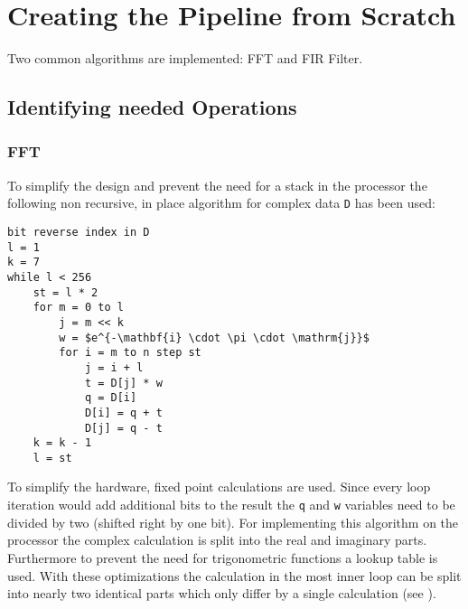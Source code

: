 \documentclass[11pt,twocolumn,technote,a4paper]{IEEEtran}
\begin{document}
\section{Creating the Pipeline from Scratch}
\label{sec:pipeline_from_scratch}
Two common algorithms are implemented: FFT and FIR Filter.
\subsection{Identifying needed Operations}
\label{sec:identify}
\subsubsection{FFT}
To simplify the design and prevent the need for a stack in the processor
the following non recursive, in place algorithm for complex data \verb+D+ has been
used:
\begin{lstlisting}[mathescape]
bit reverse index in D
l = 1
k = 7
while l < 256
    st = l * 2
    for m = 0 to l
        j = m << k
        w = $e^{-\mathbf{i} \cdot \pi \cdot \mathrm{j}}$
        for i = m to n step st
            j = i + l
            t = D[j] * w
            q = D[i]
            D[i] = q + t
            D[j] = q - t
    k = k - 1
    l = st
\end{lstlisting}
To simplify the hardware, fixed point calculations are used. Since every loop
iteration would add additional bits to the result the \verb+q+ and \verb+w+
variables need to be divided by two (shifted right by one bit).
For implementing this algorithm on the processor the complex calculation is
split into the real and imaginary parts. Furthermore to prevent the need for
trigonometric functions a lookup table is used. With these optimizations the
calculation in the most inner loop can be split into nearly two identical parts
which only differ by a single calculation (see ).
\end{document}

